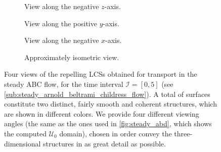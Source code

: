 \begin{figure}[htpb]
    \centering
    \hspace*{\fill}
    \begin{subfigure}[b]{0.42\textwidth}
        \centering
        \caption[]{{\small View along the negative $z$-axis.}}
        \label{fig:steady_lcss_z}
    \end{subfigure}\hfill%
    \begin{subfigure}[b]{0.42\textwidth}
        \centering
        \caption[]{{\small View along the positive $y$-axis.}}
        \label{fig:steady_lcss_y}
    \end{subfigure}%
    \hspace*{\fill}

    \hspace*{\fill}
    \begin{subfigure}[b]{0.42\textwidth}
        \centering
        \caption[]{{\small View along the negative $x$-axis.}}
        \label{fig:steady_lcss_x}
    \end{subfigure}\hfill%
    \begin{subfigure}[b]{0.42\textwidth}
        \centering
        \caption[]{{\small Approximately isometric view.}}
        \label{fig:steady_lcss_isometric}
    \end{subfigure}%
    \hspace*{\fill}
    \caption[Four views of the repelling LCSs obtained for transport in the
    steady ABC \newline{}flow]
    {
        Four views of the repelling LCSs obtained for transport in the steady
        ABC flow, for the time interval $\mathcal{I}=[0,5]$ (see
        \cref{sub:steady_arnold_beltrami_childress_flow}). A total of
         surfaces constitute two distinct, fairly smooth and
        coherent structures, which are shown in different colors. We provide
        four different viewing angles (the same as the ones used in
        \cref{fig:steady_abd}, which shows the computed $\mathcal{U}_{0}$
        domain), chosen in order convey the three-dimensional structures in as
        great detail as possible.
}
    \label{fig:steady_lcss}
\end{figure}

